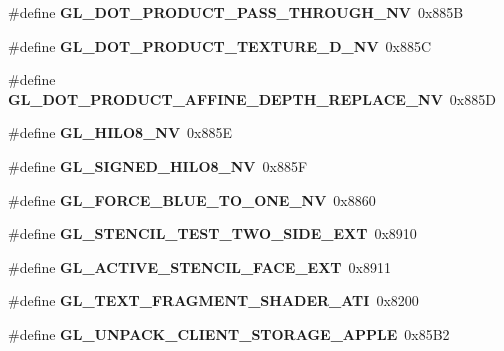 \begin{DoxyCompactItemize}
\item 
\#define {\bfseries G\+L\+\_\+\+D\+O\+T\+\_\+\+P\+R\+O\+D\+U\+C\+T\+\_\+\+P\+A\+S\+S\+\_\+\+T\+H\+R\+O\+U\+G\+H\+\_\+\+N\+V}~0x885\+B\label{_s_d_l__opengl_8h_a0b09d6599a6e9407f384a604846af3fa}

\item 
\#define {\bfseries G\+L\+\_\+\+D\+O\+T\+\_\+\+P\+R\+O\+D\+U\+C\+T\+\_\+\+T\+E\+X\+T\+U\+R\+E\+\_\+D\+\_\+\+N\+V}~0x885\+C\label{_s_d_l__opengl_8h_ac67bd7dbb1176479222329103f6ca129}

\item 
\#define {\bfseries G\+L\+\_\+\+D\+O\+T\+\_\+\+P\+R\+O\+D\+U\+C\+T\+\_\+\+A\+F\+F\+I\+N\+E\+\_\+\+D\+E\+P\+T\+H\+\_\+\+R\+E\+P\+L\+A\+C\+E\+\_\+\+N\+V}~0x885\+D\label{_s_d_l__opengl_8h_a68f68110b2934489245e5026f2448ca6}

\item 
\#define {\bfseries G\+L\+\_\+\+H\+I\+L\+O8\+\_\+\+N\+V}~0x885\+E\label{_s_d_l__opengl_8h_a266aacf166961b07951793518f37c823}

\item 
\#define {\bfseries G\+L\+\_\+\+S\+I\+G\+N\+E\+D\+\_\+\+H\+I\+L\+O8\+\_\+\+N\+V}~0x885\+F\label{_s_d_l__opengl_8h_aaab9d98225d4c8629e41083d92f06bd9}

\item 
\#define {\bfseries G\+L\+\_\+\+F\+O\+R\+C\+E\+\_\+\+B\+L\+U\+E\+\_\+\+T\+O\+\_\+\+O\+N\+E\+\_\+\+N\+V}~0x8860\label{_s_d_l__opengl_8h_a0b2c27fea042d07fd5203ffb0f046bdc}

\item 
\#define {\bfseries G\+L\+\_\+\+S\+T\+E\+N\+C\+I\+L\+\_\+\+T\+E\+S\+T\+\_\+\+T\+W\+O\+\_\+\+S\+I\+D\+E\+\_\+\+E\+X\+T}~0x8910\label{_s_d_l__opengl_8h_a823a39df4e965f6665ad70743c725947}

\item 
\#define {\bfseries G\+L\+\_\+\+A\+C\+T\+I\+V\+E\+\_\+\+S\+T\+E\+N\+C\+I\+L\+\_\+\+F\+A\+C\+E\+\_\+\+E\+X\+T}~0x8911\label{_s_d_l__opengl_8h_ad95865cf31ada5dececbc1fe5951a108}

\item 
\#define {\bfseries G\+L\+\_\+\+T\+E\+X\+T\+\_\+\+F\+R\+A\+G\+M\+E\+N\+T\+\_\+\+S\+H\+A\+D\+E\+R\+\_\+\+A\+T\+I}~0x8200\label{_s_d_l__opengl_8h_a7e6f36618146339c89a54740631d2bcf}

\item 
\#define {\bfseries G\+L\+\_\+\+U\+N\+P\+A\+C\+K\+\_\+\+C\+L\+I\+E\+N\+T\+\_\+\+S\+T\+O\+R\+A\+G\+E\+\_\+\+A\+P\+P\+L\+E}~0x85\+B2\label{_s_d_l__opengl_8h_ac1729649cf983ca18459756c75e257f0}


\end{DoxyCompactItemize}

